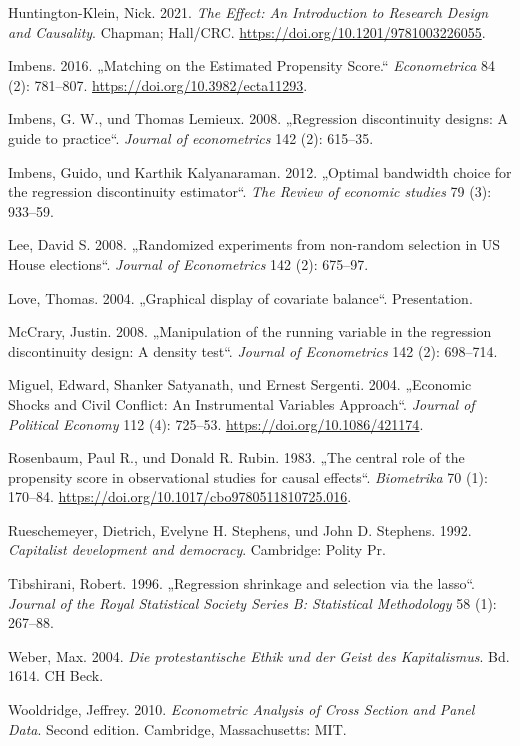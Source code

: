 \documentclass[
  a4paper,
  DIV=11,
  oneside]{scrreprt}
\newlength{\cslhangindent}
\newenvironment{CSLReferences}[2] %
 {\begin{list}{}{%
  \setlength{\itemindent}{0pt}
  \setlength{\leftmargin}{0pt}
  \setlength{\parsep}{0pt}
  \ifodd #1
   \setlength{\leftmargin}{\cslhangindent}
   \setlength{\itemindent}{-1\cslhangindent}
  \fi
  \setlength{\itemsep}{#2\baselineskip}}}
 {\end{list}}
\begin{document}
\begin{CSLReferences}{1}{0}
Huntington-Klein, Nick. 2021. \emph{The Effect: An Introduction to
Research Design and Causality}. Chapman; Hall/CRC.
\url{https://doi.org/10.1201/9781003226055}.

Imbens. 2016. {„Matching on the Estimated Propensity Score.``}
\emph{Econometrica} 84 (2): 781--807.
\url{https://doi.org/10.3982/ecta11293}.

Imbens, G. W., und Thomas Lemieux. 2008. {„Regression discontinuity
designs: A guide to practice``}. \emph{Journal of econometrics} 142 (2):
615--35.

Imbens, Guido, und Karthik Kalyanaraman. 2012. {„Optimal bandwidth
choice for the regression discontinuity estimator``}. \emph{The Review
of economic studies} 79 (3): 933--59.

Lee, David S. 2008. {„Randomized experiments from non-random selection
in US House elections``}. \emph{Journal of Econometrics} 142 (2):
675--97.

Love, Thomas. 2004. {„Graphical display of covariate balance``}.
Presentation.

McCrary, Justin. 2008. {„Manipulation of the running variable in the
regression discontinuity design: A density test``}. \emph{Journal of
Econometrics} 142 (2): 698--714.

Miguel, Edward, Shanker Satyanath, und Ernest Sergenti. 2004. {„Economic
Shocks and Civil Conflict: An Instrumental Variables Approach``}.
\emph{Journal of Political Economy} 112 (4): 725--53.
\url{https://doi.org/10.1086/421174}.

Rosenbaum, Paul R., und Donald R. Rubin. 1983. {„The central role of the
propensity score in observational studies for causal effects``}.
\emph{Biometrika} 70 (1): 170--84.
\url{https://doi.org/10.1017/cbo9780511810725.016}.

Rueschemeyer, Dietrich, Evelyne H. Stephens, und John D. Stephens. 1992.
\emph{Capitalist development and democracy}. Cambridge: Polity Pr.

Tibshirani, Robert. 1996. {„Regression shrinkage and selection via the
lasso``}. \emph{Journal of the Royal Statistical Society Series B:
Statistical Methodology} 58 (1): 267--88.

Weber, Max. 2004. \emph{Die protestantische Ethik und der Geist des
Kapitalismus}. Bd. 1614. CH Beck.

Wooldridge, Jeffrey. 2010. \emph{Econometric Analysis of Cross Section
and Panel Data}. Second edition. Cambridge, Massachusetts: MIT.

\end{CSLReferences}
\end{document}
